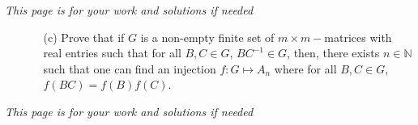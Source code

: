 \documentclass[letterpaper,12pt]{article}
\theoremstyle{definition}
\begin{document}
\pagebreak
\textit{This page is for your work and solutions if needed}
\pagebreak
\begin{enumerate}
    \item[] \begin{enumerate}
        \item[(c)] Prove that if $G$ is a non-empty finite set of $m\times m-$matrices with real entries such that for all $B,C \in G$, $BC^{-1} \in G$, then, there exists $n \in \mathbb{N}$ such that one can find an injection $f:G\mapsto A_n$ where for all $B,C \in G$, $f(BC) = f(B)f(C)$.
    \end{enumerate}
\end{enumerate}
    \pagebreak
\textit{This page is for your work and solutions if needed}
\end{document}
